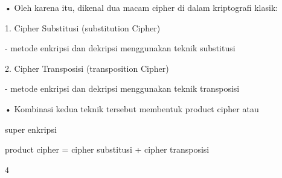 \documentclass{article}
\begin{document}

• Oleh karena itu, dikenal dua macam cipher di dalam kriptografi klasik:

1. Cipher Substitusi (substitution Cipher)

       - metode enkripsi dan dekripsi menggunakan teknik substitusi

2.  Cipher Transposisi (transposition Cipher)

        - metode enkripsi dan dekripsi menggunakan teknik transposisi

• Kombinasi kedua teknik tersebut membentuk product cipher  atau 

super enkripsi

          product cipher = cipher substitusi + cipher transposisi

4
\end{document}
